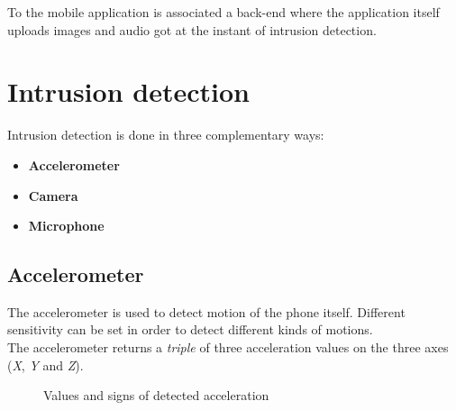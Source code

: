 \documentclass[conference]{IEEEtran}
\begin{document}
To the mobile application is associated a back-end where the application itself uploads images and audio got at the instant of intrusion detection.\\

\section{\textbf{Intrusion detection}}
Intrusion detection is done in three complementary ways:
\begin{itemize}
	\item \textbf{Accelerometer}
	\item \textbf{Camera}
	\item \textbf{Microphone}
\end{itemize}

	\subsection{Accelerometer}
The accelerometer is used to detect motion of the phone itself. Different sensitivity can be set in order to detect different kinds of motions.\\
The accelerometer returns a \textit{triple} of three acceleration values on the three axes (\textit{X}, \textit{Y} and \textit{Z}). 

\begin{figure}[!ht]
\begin{center}
\caption{Values and signs of detected acceleration}
\end{center}
\end{figure}
\end{document}
